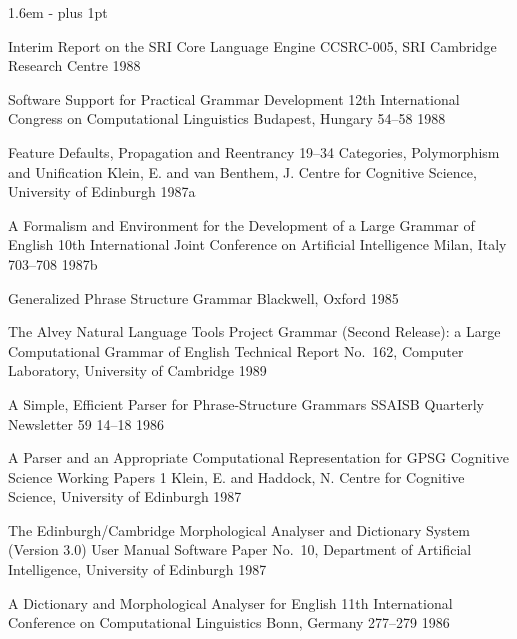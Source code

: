 \begin{list}{}
   {\leftmargin 1.6em
    \itemindent -\leftmargin
    \parsep 0pt plus 1pt}

{Interim Report on the SRI Core Language Engine}
{CCSRC-005, SRI Cambridge Research Centre}
{1988}

{Software Support for Practical Grammar Development}
{12th International Congress on Computational Linguistics}
{Budapest, Hungary}
{54--58}
{1988}

{Feature Defaults, Propagation and Reentrancy}
{19--34}
{Categories, Polymorphism and Unification}
{Klein, E. and van Benthem, J.}
{Centre for Cognitive Science, University of Edinburgh}
{1987a}

{A Formalism and Environment for the Development of a Large Grammar of English}
{10th International Joint Conference on Artificial Intelligence}
{Milan, Italy}
{703--708}
{1987b}

{Generalized Phrase Structure Grammar}
{Blackwell, Oxford}
{1985}

{The Alvey Natural Language Tools Project Grammar (Second Release): a Large Computational Grammar of English}
{Technical Report No.\ 162, Computer Laboratory, University of Cambridge}
{1989}

{A Simple, Efficient Parser for Phrase-Structure Grammars}
{SSAISB Quarterly Newsletter}
{59}
{14--18}
{1986}

{A Parser and an Appropriate Computational Representation for GPSG}
{Cognitive Science Working Papers 1}
{Klein, E. and Haddock, N.}
{Centre for Cognitive Science, University of Edinburgh}
{1987}

{The Edinburgh/Cambridge Morphological Analyser and Dictionary System (Version 3.0) User Manual}
{Software Paper No.\ 10, Department of Artificial Intelligence, University of Edinburgh}
{1987}

{A Dictionary and Morphological Analyser for English}
{11th International Conference on Computational Linguistics}
{Bonn, Germany}
{277--279}
{1986}
\end{list}


